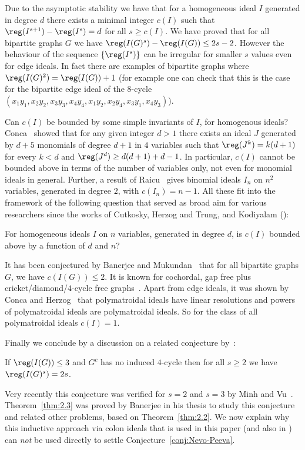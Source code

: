  Due to the asymptotic stability we have that for a homogeneous ideal $I$ generated in degree $d$ there exists a minimal integer $c(I)$ such that $\reg(I^{s+1})-\reg(I^s)=d$ for all $s\geq c(I)$. 
 We have proved that for all bipartite graphs $G$ we have $\reg(I(G)^s)- \reg(I(G)) \leq 2s-2$. 
 However the behaviour of the sequence $\{\reg(I^s)\}$ can be irregular for smaller $s$ values even for edge ideals. In fact there are examples of bipartite graphs where $\reg(I(G)^2)=\reg(I(G)) +1$ (for example one can check that this is the case for the bipartite edge ideal of the 8-cycle  $(x_1y_1,x_2y_2,x_3y_3,x_4y_4,x_1y_2,x_2y_4,x_3y_1,x_4y_3)$).

 Can $c(I)$ be bounded by some simple invariants of $I$, for homogenous ideals?
  Conca~\cite{Conca} showed that for any given integer $d > 1$ there exists an ideal $J$ generated by $d+5$ monomials of degree $d + 1$ in $4$ variables such that $\reg(J^k) = k(d + 1)$ for every $k <d$ and $\reg(J^d) \geq d(d + 1) + d-1$. In particular, $c(I)$ cannot be bounded above in terms of the number of variables only, not even for monomial ideals in general. Further, a result of Raicu~\cite{Raicu} gives binomial ideals $I_n$ on $n^2$ variables, generated in degree $2$, with $c(I_n)=n-1$. All these fit into the framework of the following question that served as broad aim for various researchers
since the works of Cutkosky, Herzog and Trung, and Kodiyalam (\cite{BBH17,Conca,CH03,CHT, huneke,ha_adam2,HHZ, JS18,vijay,Nevo, nevo_peeva}):

\begin{question}
For homogeneous ideals $I$ on $n$ variables, generated in degree $d$, is $c(I)$ bounded above by a function of $d$ and $n$?
\end{question}

 It has been conjectured by Banerjee and Mukundan~\cite{arindam_vivek} that for all bipartite graphs $G$, we have $c(I(G)) \leq 2$. 
 It is known  for cochordal, gap free plus cricket/diamond/$4$-cycle free graphs~\cite{banerjee,HHZ,Er1,Er2}. Apart from edge ideals, it was shown by Conca and Herzog~\cite{CH03} that polymatroidal ideals have linear resolutions and powers of polymatroidal ideals are polymatroidal ideals. So for the class of all polymatroidal ideals $c(I)=1$.

Finally we conclude by a discussion on a related conjecture by~\cite{nevo_peeva}:

\begin{conj}\label{conj:Nevo-Peeva}
If $\reg(I(G)) \leq 3$ and $G^c$ has no induced $4$-cycle then for all $s \geq 2$ we have $\reg (I(G)^s) =2s$.
\end{conj}
Very recently this conjecture was verified for $s=2$ and $s=3$ by Minh and Vu~\cite{minh_vu2}.
 Theorem~\ref{thm:2.3} was proved by Banerjee in his thesis to study this conjecture and related other problems, based on Theorem~\ref{thm:2.2}.
We now explain why this inductive approach via colon ideals that is used in this paper (and also in \cite{banerjee1,banerjee,BBH17,Nevo,nevo_peeva,jayanthan,JS18}) can \emph{not} be used directly to settle Conjecture~\ref{conj:Nevo-Peeva}.


